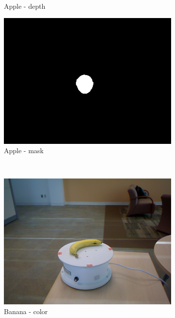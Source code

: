 \documentclass[paper=letter, fontsize=12pt]{article}
\begin{document}
\begin{figure}[htbp]
\begin{subfigure}[b]{0.32\linewidth}
		\caption{Apple - depth}
	\end{subfigure}
	\begin{subfigure}[b]{0.32\linewidth}
		\includegraphics[width=\textwidth]{apple_1_1_100_mask}
		\caption{Apple - mask}
	\end{subfigure}
	\\
	\begin{subfigure}[b]{0.32\linewidth}
		\includegraphics[width=\textwidth]{banana_1_1_100}
		\caption{Banana - color}
	\end{subfigure}
	\begin{subfigure}[b]{0.32\linewidth}

\end{subfigure}
\end{figure}
\end{document}
